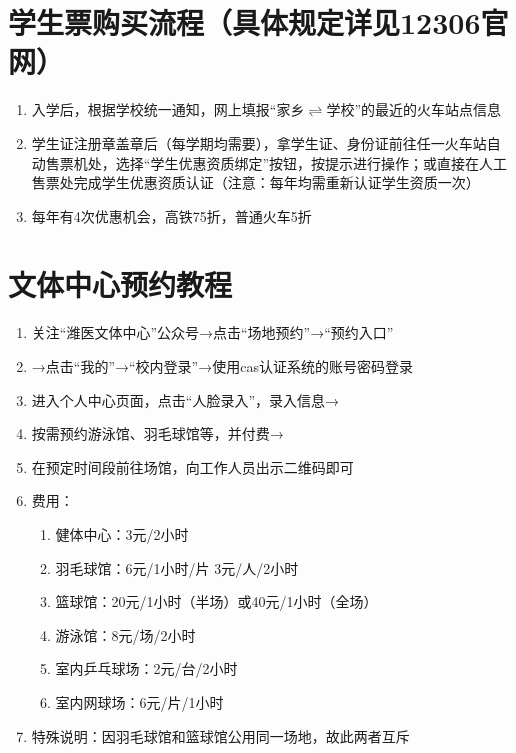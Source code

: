 \section[学生票购买流程（具体规定详见12306官网）]{学生票购买流程（具体规定详见12306官网）}
\begin{enumerate}
    \item 入学后，根据学校统一通知，网上填报“家乡$\rightleftharpoons$学校”的最近的火车站点信息
    \item 学生证注册章盖章后（每学期均需要），拿学生证、身份证前往任一火车站自动售票机处，选择“学生优惠资质绑定”按钮，按提示进行操作；或直接在人工售票处完成学生优惠资质认证（注意：每年均需重新认证学生资质一次）
    \item 每年有4次优惠机会，高铁75折，普通火车5折
\end{enumerate}

\section[文体中心预约教程]{文体中心预约教程}
\label{sports_center}
\begin{enumerate}
    \item 关注“潍医文体中心”公众号→点击“场地预约”→“预约入口”
    \item →点击“我的”→“校内登录”→使用cas认证系统的账号密码登录
    \item 进入个人中心页面，点击“人脸录入”，录入信息→
    \item 按需预约\footnotemark 游泳馆、羽毛球馆等，并付费→
    \item 在预定时间段前往场馆，向工作人员出示二维码\footnotemark 即可
    \item 费用：
    \begin{enumerate}
        \item 健体中心：3元/2小时
        \item 羽毛球馆：6元/1小时/片 3元/人/2小时
        \item 篮球馆：20元/1小时（半场）或40元/1小时（全场）
        \item 游泳馆：8元/场/2小时
        \item 室内乒乓球场：2元/台/2小时
        \item 室内网球场：6元/片/1小时
    \end{enumerate}
    \item 特殊说明：因羽毛球馆和篮球馆公用同一场地，故此两者互斥
\end{enumerate}